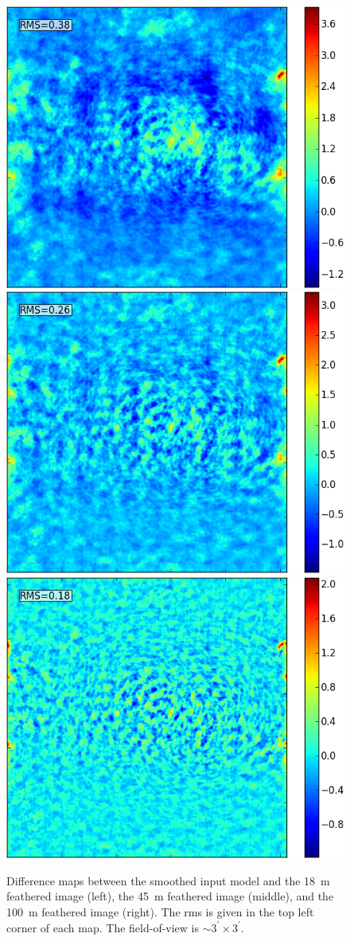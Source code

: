 \documentclass[12pt]{article}
\begin{document}
{\begin{figure}
\centering
\includegraphics[width=0.325\columnwidth]{figs54/feather18_diff.png} \includegraphics[width=0.325\columnwidth]{figs54/feather45_diff.png}
\includegraphics[width=0.325\columnwidth]{figs54/feather100_diff.png}
\caption{Difference maps between the smoothed input model and the \SI{18}{\meter} feathered image (left), the \SI{45}{\meter} feathered image (middle), and the \SI{100}{\meter} feathered image (right). The rms is given in the top left corner of each map. The field-of-view is $\sim$$3^\prime \times 3^\prime$.}
\label{fig:diff}
\end{figure}

}
\end{document}
